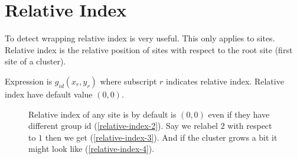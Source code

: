 \documentclass[10pt,a4paper]{report}
\begin{document}
	\section{Relative Index}
	To detect wrapping relative index is very useful. This only applies to sites. Relative index is the relative position of sites with respect to the root site (first site of a cluster).
	
	
	Expression is $g_{id} (x_r,y_r)$ where subscript $r$ indicates relative index. Relative index have default value $(0,0)$.
	
	\begin{figure}
		\centering
		\caption{Relative index of any site is by default is $(0,0)$ even if they have different group id (\ref{relative-index-2}). Say we relabel $2$ with respect to $1$ then we get (\ref{relative-index-3}). And if the cluster grows a bit it might look like (\ref{relative-index-4}).}
	\end{figure}
\end{document}
